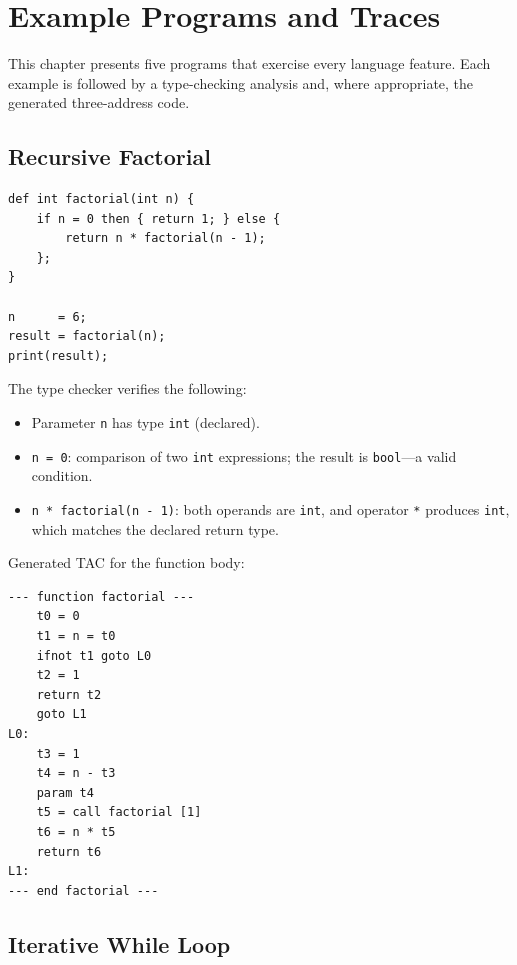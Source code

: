 \documentclass[12pt,a4paper]{report}
\newcommand{\tint}{\texttt{int}}
\newcommand{\tbool}{\texttt{bool}}
\begin{document}
\chapter{Example Programs and Traces}

This chapter presents five programs that exercise every language feature.
Each example is followed by a type-checking analysis and, where appropriate,
the generated three-address code.

\section{Recursive Factorial}

\begin{lstlisting}[caption={Recursive factorial function.}]
def int factorial(int n) {
    if n = 0 then { return 1; } else {
        return n * factorial(n - 1);
    };
}

n      = 6;
result = factorial(n);
print(result);
\end{lstlisting}

The type checker verifies the following:
\begin{itemize}
  \item Parameter \texttt{n} has type \tint{} (declared).
  \item \texttt{n = 0}: comparison of two \tint{} expressions; the result is
        \tbool{}---a valid condition.
  \item \texttt{n * factorial(n - 1)}: both operands are \tint{}, and operator
        \texttt{*} produces \tint{}, which matches the declared return type.
\end{itemize}

Generated TAC for the function body:

\begin{lstlisting}[style=tacstyle, caption={TAC for \texttt{factorial}.}]
--- function factorial ---
    t0 = 0
    t1 = n = t0
    ifnot t1 goto L0
    t2 = 1
    return t2
    goto L1
L0:
    t3 = 1
    t4 = n - t3
    param t4
    t5 = call factorial [1]
    t6 = n * t5
    return t6
L1:
--- end factorial ---
\end{lstlisting}

\section{Iterative While Loop}
\end{document}
